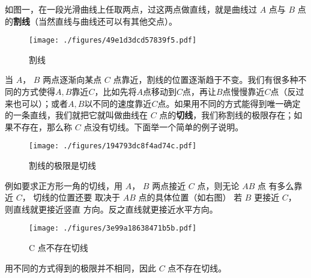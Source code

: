 


如图一，在一段光滑曲线上任取两点，过这两点做直线，就是曲线过 $A$ 点与 $B$ 点的\textbf{割线}（当然直线与曲线还可以有其他交点）。
\begin{figure}[ht]
\centering
\texttt{[image: ./figures/49e1d3dcd57839f5.pdf]}
\caption{割线} \label{fig_TanL_1}
\end{figure}

当 $A$，  $B$ 两点逐渐向某点 $C$ 点靠近，割线的位置逐渐趋于不变。我们有很多种不同的方式使得$A, B$靠近$C$，比如先将$A$点移动到$C$点，再让$B$点慢慢靠近$C$点（反过来也可以）；或者$A, B$以不同的速度靠近$C$点。如果用不同的方式能得到唯一确定的一条直线，我们就把它就叫做曲线在 $C$ 点的\textbf{切线}，我们称割线的极限存在；如果不存在，那么称 $C$ 点没有切线。下面举一个简单的例子说明。

\begin{figure}[ht]
\vskip 0pt
\centering
\texttt{[image: ./figures/194793dc8f4ad74c.pdf]}
\caption{割线的极限是切线} \label{fig_TanL_2}
\end{figure}
例如要求正方形一角的切线，用
 $A$，  $B$ 两点接近 $C$ 点，则无论 $AB$ 点
有多么靠近 $C$， 切线的位置还要
取决于 $AB$ 点的具体位置（如右图）
若 $B$ 更接近 $C$， 则直线就更接近竖直
方向。反之直线就更接近水平方向。

\begin{figure}[ht]
\centering
\texttt{[image: ./figures/3e99a18638471b5b.pdf]}
\caption{C 点不存在切线} \label{fig_TanL_3}
\end{figure}

用不同的方式得到的极限并不相同，因此 $C$ 点不存在切线。

